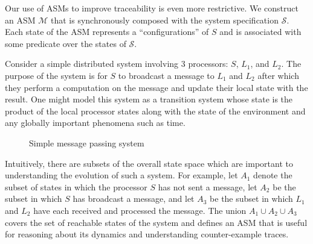 \documentclass{llncs/llncs}
\newcommand{\ben}[1]{ } %
\newcommand{\ben}[1]{ {\color{purple}$<$ben: #1$>$} } %
\begin{document}
\ben{I'm confused by this definition, but I haven't looked at the reference, so maybe it would be clear if I did. My intuitive notion of ASM involves a set of predicates B which *cover* the reachable states and a transition relation over B that abstracts the one over S.}

Our use of ASMs to improve traceability is even more restrictive. We construct an ASM $\mathcal{M}$ that is synchronously composed with the system specification $\mathcal{S}$. Each state of the ASM represents a ``configurations'' of $S$ and is associated with some predicate over the states of $\mathcal{S}$.

\begin{example}
Consider a simple distributed system involving 3 processors: $S$, $L_1$, and $L_2$. The purpose of the system is for $S$ to broadcast a message to $L_1$ and $L_2$ after which they perform a computation on the message and update their local state with the result. One might model this system as a transition system whose state is the product of the local processor states along with the state of the environment and any globally important phenomena such as time.

\begin{figure}
\centering
{}
\label{fig:exa-trans}
\caption{Simple message passing system}
\end{figure}

Intuitively, there are subsets of the overall state space which are important to understanding the evolution of such a system. For example, let $A_1$ denote the subset of states in which the processor $S$ has not sent a message, let $A_2$ be the subset in which $S$ has broadcast a message, and let $A_3$ be the subset in which $L_1$ and $L_2$ have each received and processed the message. The union $A_1 \cup A_2 \cup A_3$ covers the set of reachable states of the system and defines an ASM that is useful for reasoning about its dynamics and understanding counter-example traces.
\end{example}
\end{document}
